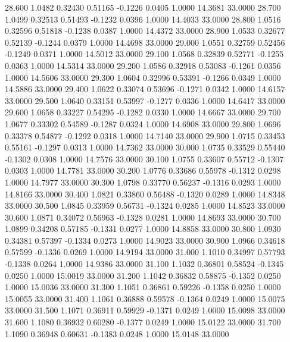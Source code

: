   28.600   1.0482   0.32430   0.51165  -0.1226   0.0405   1.0000  14.3681  33.0000
  28.700   1.0499   0.32513   0.51493  -0.1232   0.0396   1.0000  14.4033  33.0000
  28.800   1.0516   0.32596   0.51818  -0.1238   0.0387   1.0000  14.4372  33.0000
  28.900   1.0533   0.32677   0.52139  -0.1244   0.0379   1.0000  14.4698  33.0000
  29.000   1.0551   0.32759   0.52456  -0.1249   0.0371   1.0000  14.5012  33.0000
  29.100   1.0568   0.32839   0.52771  -0.1255   0.0363   1.0000  14.5314  33.0000
  29.200   1.0586   0.32918   0.53083  -0.1261   0.0356   1.0000  14.5606  33.0000
  29.300   1.0604   0.32996   0.53391  -0.1266   0.0349   1.0000  14.5886  33.0000
  29.400   1.0622   0.33074   0.53696  -0.1271   0.0342   1.0000  14.6157  33.0000
  29.500   1.0640   0.33151   0.53997  -0.1277   0.0336   1.0000  14.6417  33.0000
  29.600   1.0658   0.33227   0.54295  -0.1282   0.0330   1.0000  14.6667  33.0000
  29.700   1.0677   0.33302   0.54589  -0.1287   0.0324   1.0000  14.6908  33.0000
  29.800   1.0696   0.33378   0.54877  -0.1292   0.0318   1.0000  14.7140  33.0000
  29.900   1.0715   0.33453   0.55161  -0.1297   0.0313   1.0000  14.7362  33.0000
  30.000   1.0735   0.33529   0.55440  -0.1302   0.0308   1.0000  14.7576  33.0000
  30.100   1.0755   0.33607   0.55712  -0.1307   0.0303   1.0000  14.7781  33.0000
  30.200   1.0776   0.33686   0.55978  -0.1312   0.0298   1.0000  14.7977  33.0000
  30.300   1.0798   0.33770   0.56237  -0.1316   0.0293   1.0000  14.8166  33.0000
  30.400   1.0821   0.33860   0.56488  -0.1320   0.0289   1.0000  14.8348  33.0000
  30.500   1.0845   0.33959   0.56731  -0.1324   0.0285   1.0000  14.8523  33.0000
  30.600   1.0871   0.34072   0.56963  -0.1328   0.0281   1.0000  14.8693  33.0000
  30.700   1.0899   0.34208   0.57185  -0.1331   0.0277   1.0000  14.8858  33.0000
  30.800   1.0930   0.34381   0.57397  -0.1334   0.0273   1.0000  14.9023  33.0000
  30.900   1.0966   0.34618   0.57599  -0.1336   0.0269   1.0000  14.9194  33.0000
  31.000   1.1010   0.34997   0.57793  -0.1338   0.0264   1.0000  14.9386  33.0000
  31.100   1.1032   0.36801   0.58524  -0.1345   0.0250   1.0000  15.0019  33.0000
  31.200   1.1042   0.36832   0.58875  -0.1352   0.0250   1.0000  15.0036  33.0000
  31.300   1.1051   0.36861   0.59226  -0.1358   0.0250   1.0000  15.0055  33.0000
  31.400   1.1061   0.36888   0.59578  -0.1364   0.0249   1.0000  15.0075  33.0000
  31.500   1.1071   0.36911   0.59929  -0.1371   0.0249   1.0000  15.0098  33.0000
  31.600   1.1080   0.36932   0.60280  -0.1377   0.0249   1.0000  15.0122  33.0000
  31.700   1.1090   0.36948   0.60631  -0.1383   0.0248   1.0000  15.0148  33.0000
